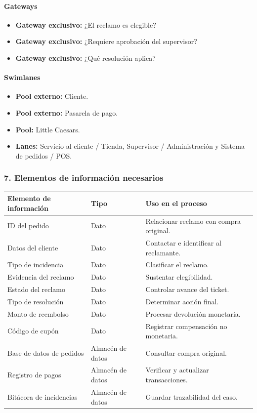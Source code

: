 \documentclass[a4paper,12pt]{article}
\begin{document}
\paragraph{Gateways}

\begin{itemize}
    \item \textbf{Gateway exclusivo:} ¿El reclamo es elegible?
    \item \textbf{Gateway exclusivo:} ¿Requiere aprobación del supervisor?
    \item \textbf{Gateway exclusivo:} ¿Qué resolución aplica?
\end{itemize}

\paragraph{Swimlanes}

\begin{itemize}
    \item \textbf{Pool externo:} Cliente.
    \item \textbf{Pool externo:} Pasarela de pago.
    \item \textbf{Pool:} Little Caesars.
    \item \textbf{Lanes:} Servicio al cliente / Tienda, Supervisor / Administración y Sistema de pedidos / POS.
\end{itemize}

\subsubsection*{7. Elementos de información necesarios}

\begin{longtable}{P{5cm} P{5cm} P{4cm}}
\toprule
\textbf{Elemento de información} & \textbf{Tipo} & \textbf{Uso en el proceso} \\
\midrule
ID del pedido & Dato & Relacionar reclamo con compra original. \\
Datos del cliente & Dato & Contactar e identificar al reclamante. \\
Tipo de incidencia & Dato & Clasificar el reclamo. \\
Evidencia del reclamo & Dato & Sustentar elegibilidad. \\
Estado del reclamo & Dato & Controlar avance del ticket. \\
Tipo de resolución & Dato & Determinar acción final. \\
Monto de reembolso & Dato & Procesar devolución monetaria. \\
Código de cupón & Dato & Registrar compensación no monetaria. \\
Base de datos de pedidos & Almacén de datos & Consultar compra original. \\
Registro de pagos & Almacén de datos & Verificar y actualizar transacciones. \\
Bitácora de incidencias & Almacén de datos & Guardar trazabilidad del caso. \\
\bottomrule
\end{longtable}
\end{document}
